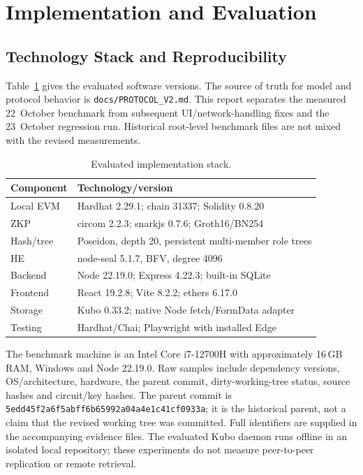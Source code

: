 \documentclass[10pt,twocolumn,a4paper]{article}
\newcommand{\code}[1]{\texttt{#1}}
\begin{document}
\section{Implementation and Evaluation}
\label{sec:impl}

\subsection{Technology Stack and Reproducibility}
Table~\ref{tab:stack} gives the evaluated software versions. The source of truth for
model and protocol behavior is \code{docs/PROTOCOL\_V2.md}. This report separates
the measured 22~October benchmark from subsequent UI/network-handling fixes and
the 23~October regression run. Historical root-level benchmark files are not mixed
with the revised measurements.

\begin{table}[t]
\centering\scriptsize\renewcommand{\arraystretch}{1.1}
\caption{Evaluated implementation stack.}
\label{tab:stack}
\begin{tabularx}{\columnwidth}{>{\raggedright\arraybackslash}p{1.65cm} >{\raggedright\arraybackslash}X}
\toprule Component & Technology/version\\\midrule
Local EVM & Hardhat 2.29.1; chain 31337; Solidity 0.8.20\\
ZKP & circom 2.2.3; snarkjs 0.7.6; Groth16/BN254\\
Hash/tree & Poseidon, depth 20, persistent multi-member role trees\\
HE & node-seal 5.1.7, BFV, degree 4096\\
Backend & Node 22.19.0; Express 4.22.3; built-in SQLite\\
Frontend & React 19.2.8; Vite 8.2.2; ethers 6.17.0\\
Storage & Kubo 0.33.2; native Node fetch/FormData adapter\\
Testing & Hardhat/Chai; Playwright with installed Edge\\\bottomrule
\end{tabularx}
\end{table}

The benchmark machine is an Intel Core i7-12700H with approximately 16\,GB RAM,
Windows and Node 22.19.0. Raw samples include dependency versions, OS/architecture,
hardware, the parent commit, dirty-working-tree status, source hashes and
circuit/key hashes. The parent commit is
\code{5edd45f2a6f5abff6b65992a04a4e1c41cf0933a}; it is the historical parent, not a
claim that the revised working tree was committed. Full identifiers are supplied
in the accompanying evidence files.
The evaluated Kubo daemon runs offline in an isolated local repository; these
experiments do not measure peer-to-peer replication or remote retrieval.
\end{document}
